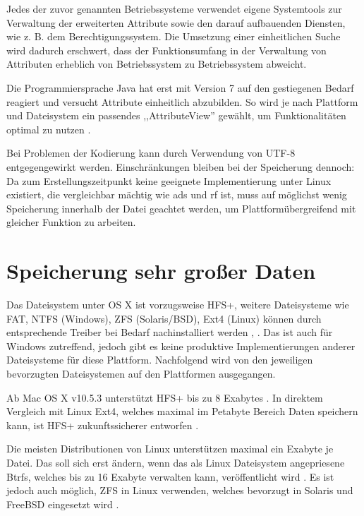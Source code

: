 \documentclass[oneside, ngerman, toc=bibliography,bibliography=totoc,listof=entryprefix, open=right,numbers=noenddot,fontsize=12pt]{scrbook}
\begin{document}
Jedes der zuvor genannten Betriebssysteme verwendet eigene Systemtools zur Verwaltung der erweiterten Attribute sowie den darauf aufbauenden Diensten, wie z. B. dem Berechtigungssystem. Die Umsetzung einer einheitlichen Suche wird dadurch erschwert, dass der Funktionsumfang in der Verwaltung von Attributen erheblich von Betriebssystem zu Betriebssystem abweicht.

Die Programmiersprache Java hat erst mit Version 7 auf den gestiegenen Bedarf reagiert und versucht Attribute einheitlich abzubilden. So wird je nach Plattform und Dateisystem ein passendes ,,AttributeView'' gewählt, um Funktionalitäten optimal zu nutzen \cite{javanio}.

Bei Problemen der Kodierung kann durch Verwendung von UTF-8 entgegengewirkt werden.
Einschränkungen bleiben bei der Speicherung dennoch: Da zum Erstellungszeitpunkt keine geeignete Implementierung unter Linux existiert, die vergleichbar mächtig  wie \acrshort{ads} und \acrshort{rf} ist, muss auf möglichst wenig Speicherung innerhalb der Datei geachtet werden, um Plattformübergreifend mit gleicher Funktion zu arbeiten.

  

\section{Speicherung sehr großer Daten}

Das Dateisystem unter OS X ist vorzugsweise {HFS+}, weitere Dateisysteme wie {FAT}, { NTFS} (Windows), {ZFS} (Solaris/BSD), {Ext4} (Linux) können durch entsprechende Treiber bei Bedarf nachinstalliert werden \cite{winext}, \cite{macntfs}. Das ist auch für Windows zutreffend, jedoch gibt es keine produktive Implementierungen anderer Dateisysteme für diese Plattform.
Nachfolgend wird von den jeweiligen bevorzugten Dateisystemen auf den Plattformen ausgegangen.

Ab Mac OS X v10.5.3 unterstützt  {HFS+} bis zu 8 Exabytes \cite{maclimit}. In direktem Vergleich mit Linux Ext4, welches maximal im Petabyte Bereich Daten speichern kann, ist HFS+ zukunftssicherer entworfen \cite{kernelwiki}.

Die meisten Distributionen von Linux unterstützen maximal ein Exabyte je Datei. Das soll sich erst ändern, wenn das als Linux Dateisystem angepriesene {Btrfs}, welches bis zu 16 Exabyte verwalten kann, veröffentlicht wird \cite{btrfs}. Es ist jedoch auch möglich, ZFS in Linux verwenden, welches bevorzugt in Solaris und FreeBSD eingesetzt wird \cite{zfslinux}.
\end{document}
